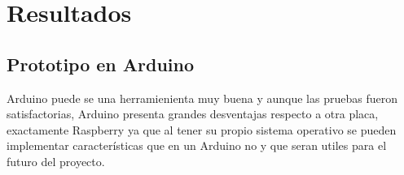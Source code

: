 \begin{comment} 
Se puede observar en la imagen \ref{evento1} que, cuando el sensor de humedad del suelo reporta valores altos, el riego se detiene en el momento. 

\begin{figure}[H]
	\begin{center}
		\subfigure[Detecci\'on de un nivel alto de humedad del suelo.]{\texttt{[image: r4]}}
		\subfigure[Riego detenido.]{\texttt{[image: r4]}}
	\end{center}
	\label{evento1}
	\caption{Primera evento considerado.}
\end{figure} 

En caso de que se detecten valores bajos de humedad en el suelo como en la imagen \ref{evento2}, el riego dar\'a inicio de manera autom\'atica. 

\begin{figure}[H]
	\begin{center}
		\subfigure[Detecci\'on de un nivel bajo de humedad del suelo.]{\texttt{[image: r4]}}
		\subfigure[Riego detenido.]{\texttt{[image: r4]}}
	\end{center}
	\label{evento2}
	\caption{Segundo evento considerado.}
\end{figure} 

Otra forma de detener el flujo de agua, es detectando un nivel de agua bajo parecido al de la imagen \ref{event3}.  

\begin{figure}[H]
	\begin{center}
		\subfigure[Detecci\'on de un bajo nivel de agua.]{\texttt{[image: r4]}}
		\subfigure[Riego detenido.]{\texttt{[image: r4]}}
	\end{center}
	\label{event3}
	\caption{Tercer evento considerado.}
\end{figure} 

\end{comment}

\section{Resultados}
\subsection{Prototipo en Arduino}
Arduino puede se una herramienienta muy buena y aunque las pruebas fueron satisfactorias, Arduino presenta grandes desventajas respecto a otra placa, exactamente Raspberry ya que al tener su propio sistema operativo se pueden implementar caracter\'isticas que en un Arduino no y que seran utiles para el futuro del proyecto.


